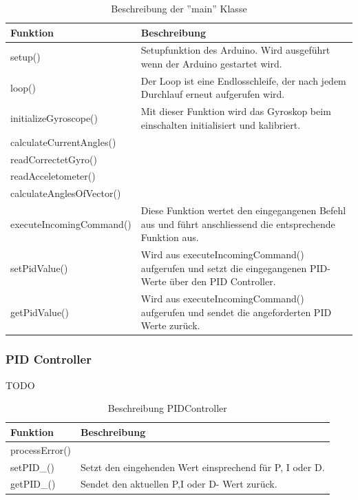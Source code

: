 \begin{table}[H]
  \centering
  \settowidth{}
  \setlength\extrarowheight{2pt}
  \begin{tabulary}{1.0\textwidth}{|L|L|}
    \hline
    \textbf{Funktion} &
    \textbf{Beschreibung}\\
    \hline
    setup() &
    Setupfunktion des Arduino. Wird ausgeführt wenn der Arduino gestartet wird.\\
    \hline
    loop() &
    Der Loop ist eine Endlosschleife, der nach jedem Durchlauf erneut aufgerufen wird.\\
    \hline
    initializeGyroscope() &
    Mit dieser Funktion wird das Gyroskop beim einschalten initialisiert und kalibriert.\\
    \hline
    calculateCurrentAngles() &
    \\
    \hline
    readCorrectetGyro() &
    \\
    \hline
    readAcceletometer() &
    \\
    \hline
    calculateAnglesOfVector() &
    \\
    \hline
    executeIncomingCommand() &
    Diese Funktion wertet den eingegangenen Befehl aus und führt anschliessend die entsprechende Funktion aus.\\
    \hline
    setPidValue() &
    Wird aus executeIncomingCommand() aufgerufen und setzt die eingegangenen PID-Werte über den PID Controller.\\
    \hline
    getPidValue() &
    Wird aus executeIncomingCommand() aufgerufen und sendet die angeforderten PID Werte zurück.\\
    \hline
  \end{tabulary}
  \caption{Beschreibung der ''main'' Klasse}
\end{table}

\subsubsection{PID Controller}
TODO
\begin{table}[H]
  \centering
  \settowidth{}
  \setlength\extrarowheight{2pt}
  \begin{tabulary}{1.0\textwidth}{|L|L|}
    \hline
    \textbf{Funktion} &
    \textbf{Beschreibung}\\
    \hline
    processError() & \\
    \hline
    setPID\_() & Setzt den eingehenden Wert einsprechend für P, I oder D. \\
    \hline
    getPID\_() & Sendet den aktuellen P,I oder D- Wert zurück.\\
    \hline
  \end{tabulary}
  \caption{Beschreibung PIDController}
\end{table}


